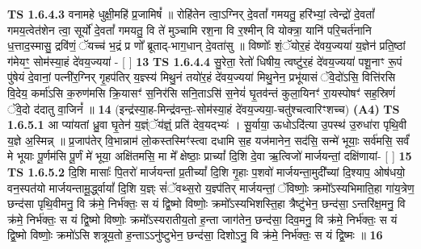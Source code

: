 \documentclass[17pt]{extarticle}
\begin{document}
                                \textbf{ TS 1.6.4.3} \newline
                  वनामहे धुक्षी॒महि॑ प्र॒जामिषं᳚ ॥ रोहि॑तेन त्वा॒ऽग्निर् दे॒वतां᳚ गमयतु॒ हरि॑भ्यां॒ त्वेन्द्रो॑ दे॒वतां᳚ गमय॒त्वेत॑शेन त्वा॒ सूर्यो॑ दे॒वतां᳚ गमयतु॒ वि ते॑ मुञ्चामि रश॒ना वि र॒श्मीन् वि योक्त्रा॒ यानि॑ परि॒चर्त॑नानि ध॒त्ताद॒स्मासु॒ द्रवि॑णं॒ ॅयच्च॑ भ॒द्रं प्र णो᳚ ब्रूताद्-भाग॒धान् दे॒वता॑सु ॥ विष्णोः᳚ शं॒ॅयोर॒हं दे॑वय॒ज्यया॑ य॒ज्ञेन॑ प्रति॒ष्ठां ग॑मेयꣳ॒॒ सोम॑स्या॒हं दे॑वय॒ज्यया॑ - [ ] \textbf{  13} \newline
                  \newline
                                \textbf{ TS 1.6.4.4} \newline
                  सु॒रेता॒ रेतो॑ धिषीय॒ त्वष्टु॑र॒हं दे॑वय॒ज्यया॑ पशू॒नाꣳ रू॒पं पु॑षेयं दे॒वानां॒ पत्नी॑र॒ग्निर् गृ॒हप॑तिर् य॒ज्ञ्स्य॑ मिथु॒नं तयो॑र॒हं दे॑वय॒ज्यया॑ मिथु॒नेन॒ प्रभू॑यासं ॅवे॒दो॑ऽसि॒ वित्ति॑रसि वि॒देय॒ कर्मा॑ऽसि क॒रुण॑मसि क्रि॒यासꣳ॑ स॒निर॑सि सनि॒ताऽसि॑ स॒नेयं॑ घृ॒तव॑न्तं कुला॒यिनꣳ॑ रा॒यस्पोषꣳ॑ सह॒स्रिणं॑ ॅवे॒दो द॑दातु वा॒जिनं᳚ ॥ \textbf{  14} \newline
                  \newline
                      (इन्द्र॑स्या॒ह-मिन्द्र॑वन्तः॒-सोम॑स्या॒हं दे॑वय॒ज्यया॒-चतु॑श्चत्वारिꣳशच्च)  \textbf{(A4)} \newline \newline
                                        \textbf{ TS 1.6.5.1} \newline
                  आ प्या॑यतां ध्रु॒वा घृ॒तेन॑ य॒ज्ञ्ंॅय॑ज्ञ्ं॒ प्रति॑ देव॒यद्भ्यः॑ । सू॒र्याया॒ ऊधोऽदि॑त्या उ॒पस्थ॑ उ॒रुधा॑रा पृथि॒वी य॒ज्ञे अ॒स्मिन्न् ॥ प्र॒जाप॑तेर् वि॒भान्नाम॑ लो॒कस्तस्मिꣳ॑स्त्वा दधामि स॒ह यज॑मानेन॒ सद॑सि॒ सन्मे॑ भूयाः॒ सर्व॑मसि॒ सर्वं॑ मे भूयाः पू॒र्णम॑सि पू॒र्णं मे॑ भूया॒ अक्षि॑तमसि॒ मा मे᳚ क्षेष्ठाः॒ प्राच्यां᳚ दि॒शि दे॒वा ऋ॒त्विजो॑ मार्जयन्तां॒ दक्षि॑णायां- [ ] \textbf{  15} \newline
                  \newline
                                \textbf{ TS 1.6.5.2} \newline
                  दि॒शि मासाः᳚ पि॒तरो॑ मार्जयन्तां प्र॒तीच्यां᳚ दि॒शि गृ॒हाः प॒शवो॑ मार्जयन्ता॒मुदी᳚च्यां दि॒श्याप॒ ओष॑धयो॒ वन॒स्पत॑यो मार्जयन्तामू॒र्द्ध्वायां᳚ दि॒शि य॒ज्ञ्ः सं॑ॅवथ्स॒रो य॒ज्ञ्प॑तिर् मार्जयन्तां॒ ॅविष्णोः॒ क्रमो᳚ऽस्यभिमाति॒हा गा॑य॒त्रेण॒ छन्द॑सा पृथि॒वीमनु॒ वि क्र॑मे॒ निर्भ॑क्तः॒ स यं द्वि॒ष्मो विष्णोः॒ क्रमो᳚ऽस्यभिशस्ति॒हा त्रैष्टु॑भेन॒ छन्द॑सा॒ ऽन्तरि॑क्ष॒मनु॒ वि क्र॑मे॒ निर्भ॑क्तः॒ स यं द्वि॒ष्मो विष्णोः॒ क्रमो᳚ऽस्यरातीय॒तो ह॒न्ता जाग॑तेन॒ छन्द॑सा॒ दिव॒मनु॒ वि क्र॑मे॒ निर्भ॑क्तः॒ स यं द्वि॒ष्मो विष्णोः॒ क्रमो॑ऽसि शत्रूय॒तो ह॒न्ताऽऽनु॑ष्टुभेन॒ छन्द॑सा॒ दिशोऽनु॒ वि क्र॑मे॒ निर्भ॑क्तः॒ स यं द्वि॒ष्मः ॥ \textbf{  16} \newline
\end{document}
